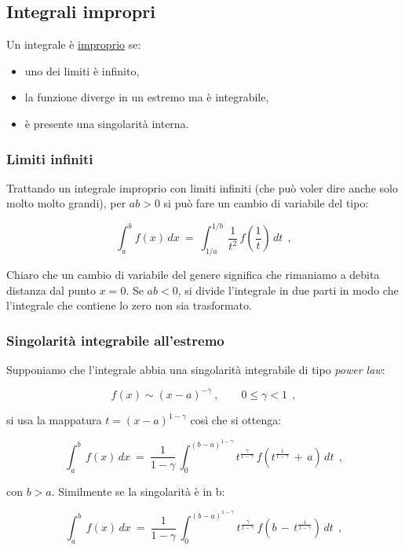 \subsection{Integrali impropri}

Un integrale è \underline{improprio} se:

\begin{itemize}
	\item uno dei limiti è infinito,
	\item la funzione diverge in un estremo ma è integrabile,
	\item è presente una singolarità interna.
\end{itemize}

\subsubsection{Limiti infiniti}

Trattando un integrale improprio con limiti infiniti (che può voler dire anche solo molto molto grandi), per $ab>0$ si può fare un cambio di variabile del tipo:

\[ \int_a^b f(x)\,dx
\ =\
\int_{1/a}^{1/b}
\,\frac{1}{t^2} \,f\!\left(\frac{1}{t}\right) \,dt\ \ ,\]

Chiaro che un cambio di variabile del genere significa che rimaniamo a debita distanza dal punto $x=0$. Se $ab<0$, si divide l’integrale in due parti in modo che l'integrale che contiene lo zero non sia trasformato.

\subsubsection{Singolarità integrabile all’estremo}

Supponiamo che l'integrale abbia una singolarità integrabile di tipo \emph{power law}:

\[
f(x) \sim (x-a)^{-\gamma}\ ,
\qquad 0 \le \gamma < 1\ \ ,
\]

si usa la mappatura $t = (x-a)^{1-\gamma}$ così che si ottenga:

\[
\int_a^b\, f(x)\,dx
\ =\
\frac{1}{1-\gamma}
\,\int_0^{(b-a)^{1-\gamma}}
t^{\frac{\gamma}{1-\gamma}}\, 
f\!\left(t^{\frac{1}{1-\gamma}}\, +\, a\right) \,dt\ \ ,
\]

con $b>a$. Similmente se la singolarità è in b:

\[
\int_a^b\, f(x)\,dx
\ =\
\frac{1}{1-\gamma}
\,\int_0^{(b-a)^{1-\gamma}}
t^{\frac{\gamma}{1-\gamma}}\, 
f\!\left( b\, -\, t^{\frac{1}{1-\gamma}}\right) \,dt\ \ ,
\]

